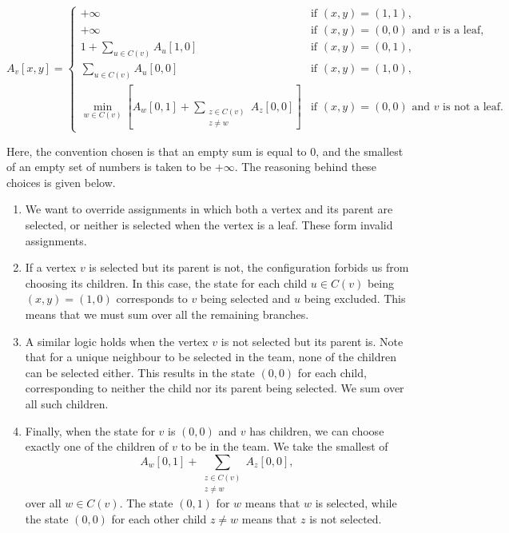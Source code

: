 \documentclass[ a4paper, 11pt]{report}
\theoremstyle{plain}
\theoremstyle{definition}
\begin{document}
$$
A_v[x,y] =
\begin{cases}
+\infty & \text{if } (x,y)=(1,1),\\
+\infty & \text{if } (x,y)=(0,0) \text{ and } v \text{ is a leaf},\\
1+\displaystyle\sum\limits_{u\in C(v)} A_u[1,0]
& \text{if } (x,y)=(0,1),\\
\displaystyle\sum\limits_{u\in C(v)} A_u[0,0]
& \text{if } (x,y)=(1,0),\\
\displaystyle\min_{w\in C(v)}
\left[
A_w[0,1]
+\sum\limits_{\substack{z\in C(v)\\z\neq w}} A_z[0,0]
\right]
& \text{if } (x,y)=(0,0) \text{ and } v \text{ is not a leaf}.
\end{cases}
$$

Here, the convention chosen is that an empty sum is equal to $0$, and the smallest of an empty set of numbers is taken to be $+\infty$. The reasoning behind these choices is given below.

\begin{enumerate}
    \item We want to override assignments in which both a vertex and its parent are selected, or neither is selected when the vertex is a leaf. These form invalid assignments.
    \item If a vertex $v$ is selected but its parent is not, the configuration forbids us from choosing its children. In this case, the state for each child $u \in C(v)$ being $(x,y)=(1,0)$ corresponds to $v$ being selected and $u$ being excluded. This means that we must sum over all the remaining branches.
    \item A similar logic holds when the vertex $v$ is not selected but its parent is. Note that for a unique neighbour to be selected in the team, none of the children can be selected either. This results in the state $(0,0)$ for each child, corresponding to neither the child nor its parent being selected. We sum over all such children.
    \item Finally, when the state for $v$ is $(0,0)$ and $v$ has children, we can choose exactly one of the children of $v$ to be in the team. We take the smallest of
    $$
    A_w[0,1] + \sum\limits_{\substack{z\in C(v)\\z\neq w}} A_z[0,0],
    $$
    over all $w \in C(v)$. The state $(0,1)$ for $w$ means that $w$ is selected, while the state $(0,0)$ for each other child $z\neq w$ means that $z$ is not selected.
\end{enumerate}
\end{document}
